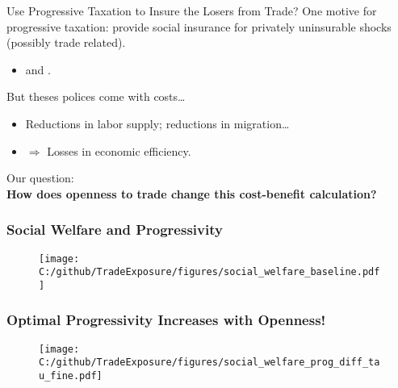 \documentclass[9pt,pdftex]{beamer}
\theoremstyle{definition}
\begin{document}

\begin{frame}[t]{Use Progressive Taxation to Insure the Losers from Trade?}
One motive for progressive taxation: provide social insurance for privately uninsurable shocks (possibly trade related).
\begin{itemize}
\item \citet{varian1980redistributive} and \citet{eaton1980optimal}.
\end{itemize}
\bigskip
But theses polices come with costs\ldots
\begin{itemize}
\item Reductions in labor supply; reductions in migration\ldots
\smallskip
\item $\Rightarrow$ Losses in economic efficiency.
\end{itemize}
\bigskip
Our question:\\
\smallskip
\textbf{How does openness to trade change this cost-benefit calculation?}
\end{frame}


\begin{frame}[t]
\frametitle{Social Welfare and Progressivity}
\begin{figure}[t]
\centerline{\texttt{[image: C:/github/TradeExposure/figures/social\_welfare\_baseline.pdf]}}
\end{figure}
\end{frame}


\begin{frame}[t]
\frametitle{Optimal Progressivity Increases with Openness!}
\begin{figure}[t]
\centerline{\texttt{[image: C:/github/TradeExposure/figures/social\_welfare\_prog\_diff\_tau\_fine.pdf]}}
\end{figure}
\end{frame}
\end{document}
